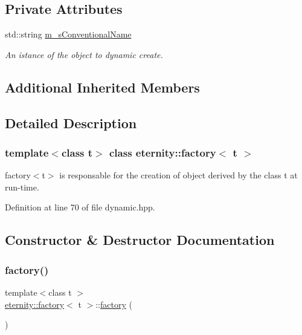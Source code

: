 \subsection*{Private Attributes}
\begin{DoxyCompactItemize}
\item 
std\+::string \hyperlink{classeternity_1_1factory_abf647d721a959e2a9728ff79b2bf094d}{m\+\_\+s\+Conventional\+Name}
\begin{DoxyCompactList}\small\item\em An istance of the object to dynamic create. \end{DoxyCompactList}\end{DoxyCompactItemize}
\subsection*{Additional Inherited Members}


\subsection{Detailed Description}
\subsubsection*{template$<$class t$>$\newline
class eternity\+::factory$<$ t $>$}

factory$<$t$>$ is responsable for the creation of object derived by the class t at run-\/time. 

Definition at line 70 of file dynamic.\+hpp.



\subsection{Constructor \& Destructor Documentation}
\mbox{\label{classeternity_1_1factory_a0fc6f0a6ec7ef7057f06924b948d8c94}} 
\subsubsection{\texorpdfstring{factory()}{factory()}\hspace{0.1cm}{\footnotesize\ttfamily [1/2]}}
{\footnotesize\ttfamily template$<$class t $>$ \\
\hyperlink{classeternity_1_1factory}{eternity\+::factory}$<$ t $>$\+::\hyperlink{classeternity_1_1factory}{factory} (\begin{DoxyParamCaption}{ }\end{DoxyParamCaption})}



